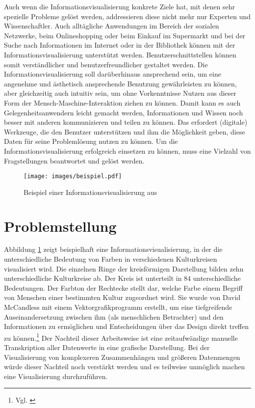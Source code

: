 \documentclass[a4paper, 12pt, DIV=calc, version=first, pdftex, headsepline, footsepline, bibtotocnumbered, liststotocnumbered]{scrreprt}
\begin{document}
Auch wenn die Informationsvisualisierung konkrete Ziele hat, mit denen sehr spezielle Probleme gelöst
werden, addressieren diese nicht mehr nur Experten und Wissenschaftler. Auch alltägliche Anwendungen
im Bereich der sozialen Netzwerke, beim Onlineshopping oder beim Einkauf im Supermarkt und bei der Suche nach Informationen
im Internet oder in der Bibliothek können mit der Informationsvisualisierung unterstützt
werden. Benutzerschnittstellen können somit verständlicher und benutzerfreundlicher gestaltet werden.
Die Informationsvisualisierung soll darüberhinaus ansprechend sein, um eine angenehme und ästhetisch ansprechende Benutzung
gewährleisten zu können, aber gleichzeitig auch intuitiv sein, um ohne Vorkenntnisse Nutzen aus
dieser Form der Mensch-Maschine-Interaktion ziehen zu können. Damit kann es auch Gelegenheitsanwendern
leicht gemacht werden, Informationen und
Wissen noch besser mit anderen kommunizieren und teilen zu können. Das erfordert (digitale) Werkzeuge,
die den Benutzer unterstützen und ihm die Möglichkeit geben, diese Daten für seine Problemlösung nutzen zu können.
Um die Informationsvisualisierung erfolgreich einsetzen zu können, muss eine Vielzahl von Fragstellungen
beantwortet und gelöst werden.
\begin{figure}
\centering
\texttt{[image: images/beispiel.pdf]}
\caption{Beispiel einer Informationsvisualisierung aus \citep[S.\,76]{McCandless}}
\label{fig:beispiel}
\end{figure}
\section{Problemstellung}
Abbildung \ref{fig:beispiel} zeigt beispielhaft eine Informationsvisualisierung, in der die
unterschiedliche Bedeutung von Farben in verschiedenen
Kulturkreisen visualisiert wird. Die einzelnen Ringe der kreisförmigen Darstellung bilden zehn
unterschiedliche Kulturkreise ab. Der Kreis ist unterteilt in 84 unterschiedliche Bedeutungen.
Der Farbton der Rechtecke stellt dar, welche Farbe einem Begriff von Menschen einer bestimmten Kultur zugeordnet wird.
Sie wurde von David McCandless mit einem Vektorgrafikprogramm erstellt, um
eine tiefgreifende Auseinandersetzung zwischen ihm (als menschlichen Betrachter) und den Informationen
zu ermöglichen und Entscheidungen über das Design direkt treffen zu können.\footnote{Vgl. \citep{infoblog}} Der Nachteil dieser
Arbeitsweise ist eine zeitaufwändige manuelle Transkription aller Datenwerte in eine grafische
Darstellung. Bei der Visualisierung von komplexeren Zusammenhängen und größeren Datenmengen würde dieser 
Nachteil noch verstärkt werden und es teilweise unmöglich machen eine Visualisierung durchzuführen.
\end{document}
